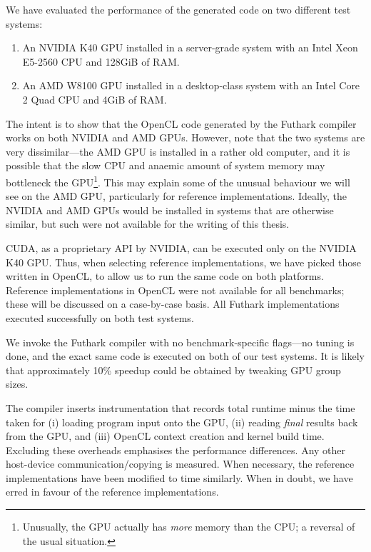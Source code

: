 We have evaluated the performance of the generated code on two
different test systems:

\begin{enumerate}
\item An NVIDIA K40 GPU installed in a server-grade system with an
  Intel Xeon E5-2560 CPU and 128GiB of RAM.
\item An AMD W8100 GPU installed in a desktop-class system with an
  Intel Core 2 Quad CPU and 4GiB of RAM.
\end{enumerate}

The intent is to show that the OpenCL code generated by the Futhark
compiler works on both NVIDIA and AMD GPUs.  However, note that the
two systems are very dissimilar---the AMD GPU is installed in a rather
old computer, and it is possible that the slow CPU and anaemic amount
of system memory may bottleneck the GPU\footnote{Unusually, the GPU
  actually has \textit{more} memory than the CPU; a reversal of the
  usual situation.}.  This may explain some of the unusual behaviour
we will see on the AMD GPU, particularly for reference
implementations.  Ideally, the NVIDIA and AMD GPUs would be installed
in systems that are otherwise similar, but such were not available for
the writing of this thesis.

CUDA, as a proprietary API by NVIDIA, can be executed only on the
NVIDIA K40 GPU.  Thus, when selecting reference implementations, we
have picked those written in OpenCL, to allow us to run the same code
on both platforms.  Reference implementations in OpenCL were not
available for all benchmarks; these will be discussed on a
case-by-case basis.  All Futhark implementations executed successfully
on both test systems.

We invoke the Futhark compiler with no benchmark-specific flags---no
tuning is done, and the exact same code is executed on both of our
test systems.  It is likely that approximately 10\% speedup could be
obtained by tweaking GPU group sizes.

The compiler inserts instrumentation that records total runtime minus
the time taken for (i) loading program input onto the GPU, (ii)
reading \textit{final} results back from the GPU, and (iii) OpenCL
context creation and kernel build time.  Excluding these overheads
emphasises the performance differences.  Any other host-device
communication/copying is measured.  When necessary, the reference
implementations have been modified to time similarly.  When in doubt,
we have erred in favour of the reference implementations.

